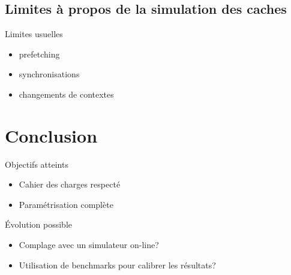 \subsection{Limites \`a  propos de la simulation des caches}
\begin{frame}
  \begin{block}{Limites usuelles}
    \begin{itemize}
      \item \textsf{prefetching}
      \item synchronisations
      \item changements de contextes 
    \end{itemize}
  \end{block}
\end{frame}


\section*{Conclusion}
\begin{frame}
  \begin{block}{Objectifs atteints}
    \begin{itemize}
      \item Cahier des charges respect\'e
      \item Param\'etrisation compl\`ete
    \end{itemize}
  \end{block}

  \begin{block}{\'Evolution possible}
    \begin{itemize}
      \item Complage avec un simulateur \textsf{on-line}?
      \item Utilisation de benchmarks pour calibrer les r\'esultats?
    \end{itemize}
  \end{block}
\end{frame}
